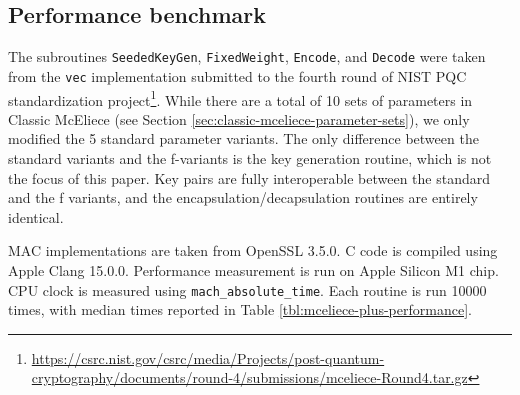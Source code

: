 \documentclass[runningheads]{llncs}
\begin{document}

\subsection{Performance benchmark}
The subroutines \texttt{SeededKeyGen}, \texttt{FixedWeight}, \texttt{Encode}, and \texttt{Decode} were taken from the \texttt{vec} implementation submitted to the fourth round of NIST PQC standardization project\footnote{\url{https://csrc.nist.gov/csrc/media/Projects/post-quantum-cryptography/documents/round-4/submissions/mceliece-Round4.tar.gz}}. While there are a total of 10 sets of parameters in Classic McEliece (see Section \ref{sec:classic-mceliece-parameter-sets}), we only modified the 5 standard parameter variants. The only difference between the standard variants and the f-variants is the key generation routine, which is not the focus of this paper. Key pairs are fully interoperable between the standard and the f variants, and the encapsulation/decapsulation routines are entirely identical.

MAC implementations are taken from OpenSSL 3.5.0. C code is compiled using Apple Clang 15.0.0. Performance measurement is run on Apple Silicon M1 chip. CPU clock is measured using \texttt{mach\_absolute\_time}. Each routine is run 10000 times, with median times reported in Table \ref{tbl:mceliece-plus-performance}.
\end{document}

